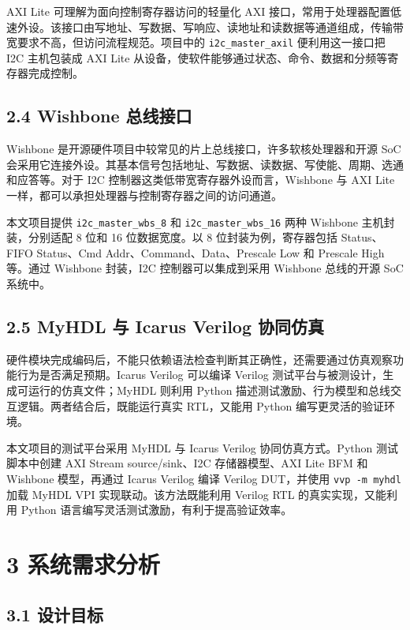 AXI Lite 可理解为面向控制寄存器访问的轻量化 AXI
接口，常用于处理器配置低速外设。该接口由写地址、写数据、写响应、读地址和读数据等通道组成，传输带宽要求不高，但访问流程规范。项目中的
\texttt{i2c\_master\_axil} 便利用这一接口把 I2C 主机包装成 AXI Lite
从设备，使软件能够通过状态、命令、数据和分频等寄存器完成控制。

\subsection{2.4 Wishbone
总线接口}\label{wishbone-ux603bux7ebfux63a5ux53e3}

Wishbone 是开源硬件项目中较常见的片上总线接口，许多软核处理器和开源 SoC
会采用它连接外设。其基本信号包括地址、写数据、读数据、写使能、周期、选通和应答等。对于
I2C 控制器这类低带宽寄存器外设而言，Wishbone 与 AXI Lite
一样，都可以承担处理器与控制寄存器之间的访问通道。

本文项目提供 \texttt{i2c\_master\_wbs\_8} 和
\texttt{i2c\_master\_wbs\_16} 两种 Wishbone 主机封装，分别适配 8 位和 16
位数据宽度。以 8 位封装为例，寄存器包括 Status、FIFO Status、Cmd
Addr、Command、Data、Prescale Low 和 Prescale High 等。通过 Wishbone
封装，I2C 控制器可以集成到采用 Wishbone 总线的开源 SoC 系统中。

\subsection{2.5 MyHDL 与 Icarus Verilog
协同仿真}\label{myhdl-ux4e0e-icarus-verilog-ux534fux540cux4effux771f}

硬件模块完成编码后，不能只依赖语法检查判断其正确性，还需要通过仿真观察功能行为是否满足预期。Icarus
Verilog 可以编译 Verilog 测试平台与被测设计，生成可运行的仿真文件；MyHDL
则利用 Python
描述测试激励、行为模型和总线交互逻辑。两者结合后，既能运行真实
RTL，又能用 Python 编写更灵活的验证环境。

本文项目的测试平台采用 MyHDL 与 Icarus Verilog 协同仿真方式。Python
测试脚本中创建 AXI Stream source/sink、I2C 存储器模型、AXI Lite BFM 和
Wishbone 模型，再通过 Icarus Verilog 编译 Verilog DUT，并使用
\texttt{vvp\ -m\ myhdl} 加载 MyHDL VPI 实现联动。该方法既能利用 Verilog
RTL 的真实实现，又能利用 Python
语言编写灵活测试激励，有利于提高验证效率。

\section{3 系统需求分析}\label{ux7cfbux7edfux9700ux6c42ux5206ux6790}

\subsection{3.1 设计目标}\label{ux8bbeux8ba1ux76eeux6807}

